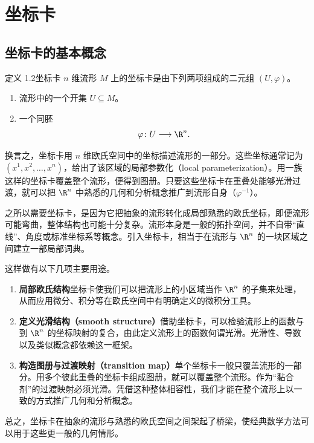 \section{坐标卡}
\subsection{坐标卡的基本概念}
\begin{statement}{定义 1.2}{坐标卡}
$n$ 维流形 $M$ 上的坐标卡是由下列两项组成的二元组 $(U,\varphi)$。
\begin{enumerate}
  \item 流形中的一个开集 $U\subseteq M$。
  \item 一个同胚
  \[
    \varphi\colon U\longrightarrow\R^n.
  \]
\end{enumerate}
换言之，坐标卡用 $n$ 维欧氏空间中的坐标描述流形的一部分。这些坐标通常记为 $(x^1,x^2,\ldots,x^n)$，给出了该区域的局部参数化（local parameterization）。用一族这样的坐标卡覆盖整个流形，便得到图册。只要这些坐标卡在重叠处能够光滑过渡，就可以把 $\R^n$ 中熟悉的几何和分析概念推广到流形自身（$\varphi^{-1}$）。

之所以需要坐标卡，是因为它把抽象的流形转化成局部熟悉的欧氏坐标，即便流形可能弯曲，整体结构也可能十分复杂。流形本身是一般的拓扑空间，并不自带“直线”、角度或标准坐标系等概念。引入坐标卡，相当于在流形与 $\R^n$ 的一块区域之间建立一部局部词典。

这样做有以下几项主要用途。
\begin{enumerate}
  \item \textbf{局部欧氏结构}\quad 坐标卡使我们可以把流形上的小区域当作 $\R^n$ 的子集来处理，从而应用微分、积分等在欧氏空间中有明确定义的微积分工具。
  \item \textbf{定义光滑结构（smooth structure）}\quad 借助坐标卡，可以检验流形上的函数与到 $\R^n$ 的坐标映射的复合，由此定义流形上的函数何谓光滑。光滑性、导数以及类似概念都依赖这一框架。
  \item \textbf{构造图册与过渡映射（transition map）}\quad 单个坐标卡一般只覆盖流形的一部分。用多个彼此重叠的坐标卡组成图册，就可以覆盖整个流形。作为“黏合剂”的过渡映射必须光滑。凭借这种整体相容性，我们才能在整个流形上以一致的方式推广几何和分析概念。
\end{enumerate}
总之，坐标卡在抽象的流形与熟悉的欧氏空间之间架起了桥梁，使经典数学方法可以用于这些更一般的几何情形。
\end{statement}

